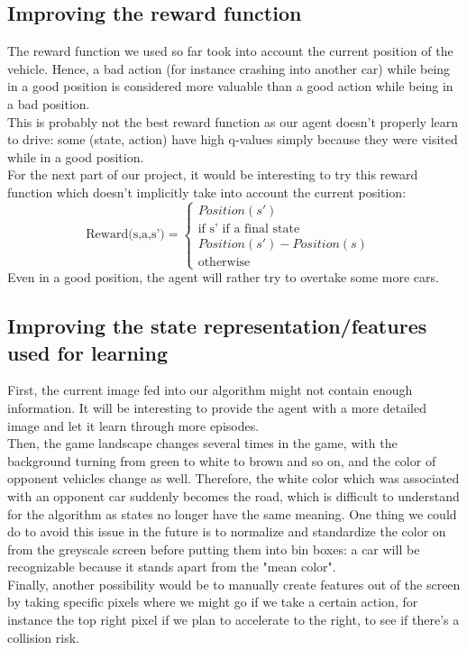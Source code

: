 \documentclass[10pt,twocolumn,letterpaper]{article}
\begin{document}
\subsection*{Improving the reward function}

The reward function we used so far took into account the current position of the vehicle. Hence, a bad action (for instance crashing into another car) while being in a good position is considered more valuable than a good action while being in a bad position. \\
This is probably not the best reward function as our agent doesn't properly learn to drive: some (state, action) have high q-values simply because they were visited while in a good position.\\
For the next part of our project, it would be interesting to try this reward function which doesn't implicitly take into account the current position:
\[ \text{Reward(s,a,s')} = \begin{cases}Position(s') &\\ \text{if s' if a final state}\\Position(s')-Position(s) & \\\text{otherwise} \end{cases}\]
Even in a good position, the agent will rather try to overtake some more cars.

\subsection*{Improving the state representation/features used for learning}

First, the current image fed into our algorithm might not contain enough information. It will be interesting to provide the agent with a more detailed image and let it learn through more episodes.\\
Then, the game landscape changes several times in the game, with the background turning from green to white to brown and so on, and the color of opponent vehicles change as well. Therefore, the white color which was associated with an opponent car suddenly becomes the road, which is difficult to understand for the algorithm as states no longer have the same meaning. One thing we could do to avoid this issue in the future is to normalize and standardize the color on from the greyscale screen before putting them into bin boxes: a car will be recognizable because it stands apart from the "mean color".\\
Finally, another possibility would be to manually create features out of the screen by taking specific pixels where we might go if we take a certain action, for instance the top right pixel if we plan to accelerate to the right, to see if there's a collision risk.
\end{document}

